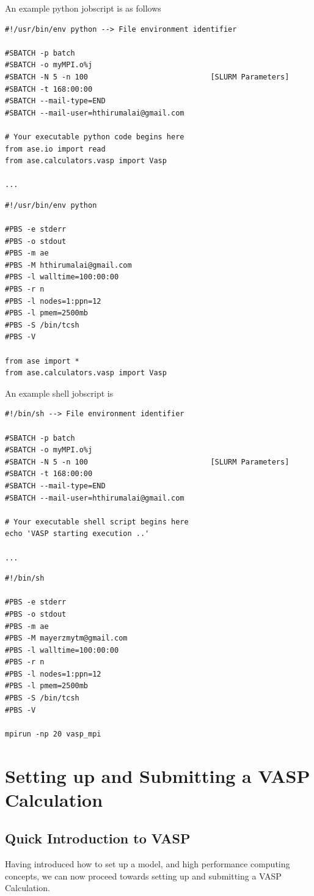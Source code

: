 \documentclass[11pt]{article}
\begin{document}
An example python jobscript is  as follows
\begin{verbatim}
#!/usr/bin/env python --> File environment identifier

#SBATCH -p batch
#SBATCH -o myMPI.o%j
#SBATCH -N 5 -n 100                            [SLURM Parameters]
#SBATCH -t 168:00:00
#SBATCH --mail-type=END
#SBATCH --mail-user=hthirumalai@gmail.com

# Your executable python code begins here
from ase.io import read
from ase.calculators.vasp import Vasp

...
\end{verbatim}

\begin{verbatim}
#!/usr/bin/env python

#PBS -e stderr
#PBS -o stdout
#PBS -m ae
#PBS -M hthirumalai@gmail.com
#PBS -l walltime=100:00:00
#PBS -r n
#PBS -l nodes=1:ppn=12
#PBS -l pmem=2500mb
#PBS -S /bin/tcsh
#PBS -V

from ase import *
from ase.calculators.vasp import Vasp
\end{verbatim}

An example shell jobscript is
\begin{verbatim}
#!/bin/sh --> File environment identifier

#SBATCH -p batch
#SBATCH -o myMPI.o%j
#SBATCH -N 5 -n 100                            [SLURM Parameters]
#SBATCH -t 168:00:00
#SBATCH --mail-type=END
#SBATCH --mail-user=hthirumalai@gmail.com

# Your executable shell script begins here
echo 'VASP starting execution ..'

...
\end{verbatim}

\begin{verbatim}
#!/bin/sh

#PBS -e stderr
#PBS -o stdout
#PBS -m ae
#PBS -M mayerzmytm@gmail.com
#PBS -l walltime=100:00:00
#PBS -r n
#PBS -l nodes=1:ppn=12
#PBS -l pmem=2500mb
#PBS -S /bin/tcsh
#PBS -V

mpirun -np 20 vasp_mpi
\end{verbatim}

\section{Setting up and Submitting a VASP Calculation}
\label{sec-4}
\subsection{Quick Introduction to VASP}
\label{sec-4-1}
Having introduced how to set up a model, and high performance computing concepts, we can now proceed towards setting up and submitting a VASP Calculation.
\end{document}
